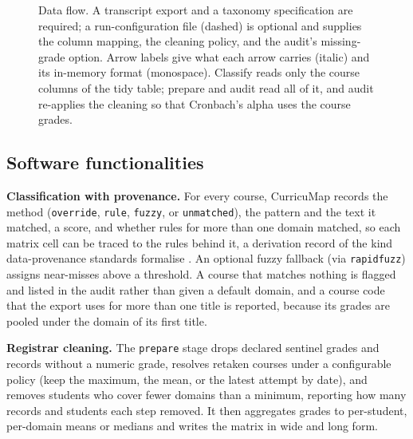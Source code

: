 \documentclass[preprint,12pt,a4paper]{elsarticle}
\begin{document}
\begin{figure}[t]
{}
\caption{Data flow. A transcript export and a taxonomy specification are required; a run-configuration file (dashed) is optional and supplies the column mapping, the cleaning policy, and the audit's missing-grade option. Arrow labels give what each arrow carries (italic) and its in-memory format (monospace). Classify reads only the course columns of the tidy table; prepare and audit read all of it, and audit re-applies the cleaning so that Cronbach's alpha uses the course grades.}
\label{fig:dataflow}
\end{figure}

\subsection{Software functionalities}

\textbf{Classification with provenance.} For every course, CurricuMap records the method (\texttt{override}, \texttt{rule}, \texttt{fuzzy}, or \texttt{unmatched}), the pattern and the text it matched, a score, and whether rules for more than one domain matched, so each matrix cell can be traced to the rules behind it, a derivation record of the kind data-provenance standards formalise \cite{provdm}. An optional fuzzy fallback (via \texttt{rapidfuzz}) assigns near-misses above a threshold. A course that matches nothing is flagged and listed in the audit rather than given a default domain, and a course code that the export uses for more than one title is reported, because its grades are pooled under the domain of its first title.

\textbf{Registrar cleaning.} The \texttt{prepare} stage drops declared sentinel grades and records without a numeric grade, resolves retaken courses under a configurable policy (keep the maximum, the mean, or the latest attempt by date), and removes students who cover fewer domains than a minimum, reporting how many records and students each step removed. It then aggregates grades to per-student, per-domain means or medians and writes the matrix in wide and long form.
\end{document}
